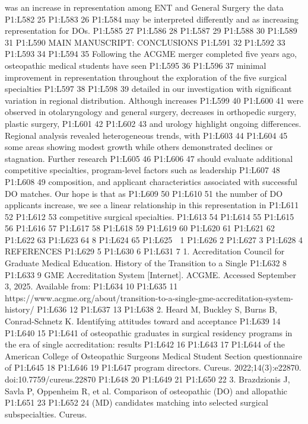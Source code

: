 was an increase in representation among ENT and General Surgery the data
P1:L582 25 P1:L583 26 P1:L584 may be interpreted differently and as
increasing representation for DOs. P1:L585 27 P1:L586 28 P1:L587 29
P1:L588 30 P1:L589 31 P1:L590 MAIN MANUSCRIPT: CONCLUSIONS P1:L591 32
P1:L592 33 P1:L593 34 P1:L594 35 Following the ACGME merger completed
five years ago, osteopathic medical students have seen P1:L595 36
P1:L596 37 minimal improvement in representation throughout the
exploration of the five surgical specialties P1:L597 38 P1:L598 39
detailed in our investigation with significant variation in regional
distribution. Although increases P1:L599 40 P1:L600 41 were observed in
otolaryngology and general surgery, decreases in orthopedic surgery,
plastic surgery, P1:L601 42 P1:L602 43 and urology highlight ongoing
differences. Regional analysis revealed heterogeneous trends, with
P1:L603 44 P1:L604 45 some areas showing modest growth while others
demonstrated declines or stagnation. Further research P1:L605 46 P1:L606
47 should evaluate additional competitive specialties, program-level
factors such as leadership P1:L607 48 P1:L608 49 composition, and
applicant characteristics associated with successful DO matches. Our
hope is that as P1:L609 50 P1:L610 51 the number of DO applicants
increase, we see a linear relationship in this representation in P1:L611
52 P1:L612 53 competitive surgical specialties. P1:L613 54 P1:L614 55
P1:L615 56 P1:L616 57 P1:L617 58 P1:L618 59 P1:L619 60 P1:L620 61
P1:L621 62 P1:L622 63 P1:L623 64 8 P1:L624 65 P1:L625  1 P1:L626 2
P1:L627 3 P1:L628 4 REFERENCES P1:L629 5 P1:L630 6 P1:L631 7 1.
Accreditation Council for Graduate Medical Education. History of the
Transition to a Single P1:L632 8 P1:L633 9 GME Accreditation System
{[}Internet{]}. ACGME. Accessed September 3, 2025. Available from:
P1:L634 10 P1:L635 11
https://www.acgme.org/about/transition-to-a-single-gme-accreditation-system-history/
P1:L636 12 P1:L637 13 P1:L638 2. Heard M, Buckley S, Burns B,
Conrad-Schnetz K. Identifying attitudes toward and acceptance P1:L639 14
P1:L640 15 P1:L641 of osteopathic graduates in surgical residency
programs in the era of single accreditation: results P1:L642 16 P1:L643
17 P1:L644 of the American College of Osteopathic Surgeons Medical
Student Section questionnaire of P1:L645 18 P1:L646 19 P1:L647 program
directors. Cureus. 2022;14(3):e22870. doi:10.7759/cureus.22870 P1:L648
20 P1:L649 21 P1:L650 22 3. Brazdzionis J, Savla P, Oppenheim R, et al.
Comparison of osteopathic (DO) and allopathic P1:L651 23 P1:L652 24 (MD)
candidates matching into selected surgical subspecialties. Cureus.
